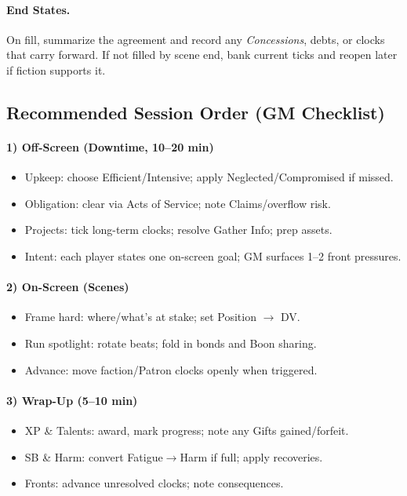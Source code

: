 \paragraph{End States.}
On fill, summarize the agreement and record any \emph{Concessions}, debts, or clocks that carry forward. If not filled by scene end, bank current ticks and reopen later if fiction supports it.

\subsection{Recommended Session Order (GM Checklist)}

\paragraph{1) Off-Screen (Downtime, 10–20 min)}
\begin{itemize}
  \item Upkeep: choose Efficient/Intensive; apply Neglected/Compromised if missed.
  \item Obligation: clear via Acts of Service; note Claims/overflow risk.
  \item Projects: tick long-term clocks; resolve Gather Info; prep assets.
  \item Intent: each player states one on-screen goal; GM surfaces 1–2 front pressures.
\end{itemize}

\paragraph{2) On-Screen (Scenes)}
\begin{itemize}
  \item Frame hard: where/what’s at stake; set Position $\to$ DV.
  \item Run spotlight: rotate beats; fold in bonds and Boon sharing.
  \item Advance: move faction/Patron clocks openly when triggered.
\end{itemize}

\paragraph{3) Wrap-Up (5–10 min)}
\begin{itemize}
  \item XP \& Talents: award, mark progress; note any Gifts gained/forfeit.
  \item SB \& Harm: convert Fatigue$\to$Harm if full; apply recoveries.
  \item Fronts: advance unresolved clocks; note consequences.
\end{itemize}

